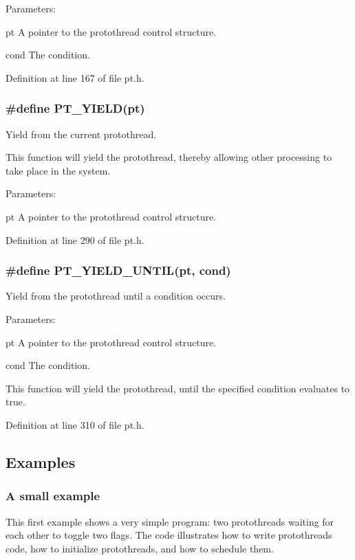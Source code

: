 \documentclass[12pt]{article}
\begin{document}
\begin{CJK}{UTF8}{bsmi}
Parameters:

pt A pointer to the protothread control structure.

cond The condition.

Definition at line 167 of file pt.h.

\subsubsection{\#define PT\_YIELD(pt)}

Yield from the current protothread.

This function will yield the protothread, thereby allowing other processing to take place in the system.

Parameters:

pt A pointer to the protothread control structure.

Definition at line 290 of file pt.h.

\subsubsection{\#define PT\_YIELD\_UNTIL(pt, cond)}

Yield from the protothread until a condition occurs.

Parameters:

pt A pointer to the protothread control structure.

cond The condition.

This function will yield the protothread, until the specified condition evaluates to true.

Definition at line 310 of file pt.h.

\subsection{Examples}

\subsubsection{A small example}

This first example shows a very simple program: two protothreads waiting for each other to toggle two flags. The code illustrates how to write protothreads code, how to initialize protothreads, and how to schedule them.



\end{CJK}
\end{document}
